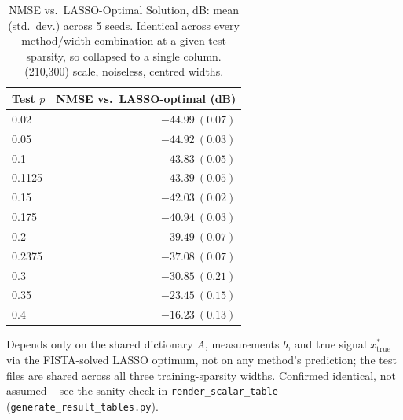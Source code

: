 \begin{table}[htbp]
\centering
\caption{NMSE vs.\ LASSO-Optimal Solution, dB: mean (std.\ dev.) across 5 seeds. Identical across every method/width combination at a given test sparsity, so collapsed to a single column. (210,300) scale, noiseless, centred widths.}
\label{tab:exp2try3-nmse-lassoopt}
\begin{tabular}{@{} l r @{}}
\toprule
Test $p$ & NMSE vs.\ LASSO-optimal (dB) \\
\midrule
0.02 & $-44.99\ (0.07)$ \\
0.05 & $-44.92\ (0.03)$ \\
0.1 & $-43.83\ (0.05)$ \\
0.1125 & $-43.39\ (0.05)$ \\
0.15 & $-42.03\ (0.02)$ \\
0.175 & $-40.94\ (0.03)$ \\
0.2 & $-39.49\ (0.07)$ \\
0.2375 & $-37.08\ (0.07)$ \\
0.3 & $-30.85\ (0.21)$ \\
0.35 & $-23.45\ (0.15)$ \\
0.4 & $-16.23\ (0.13)$ \\
\bottomrule
\end{tabular}
\vspace{2pt}
\begin{minipage}{\linewidth}\footnotesize
Depends only on the shared dictionary $A$, measurements $b$, and true signal $x^*_{\text{true}}$ via the FISTA-solved LASSO optimum, not on any method's prediction; the test files are shared across all three training-sparsity widths. Confirmed identical, not assumed -- see the sanity check in \texttt{render\_scalar\_table} (\texttt{generate\_result\_tables.py}).
\end{minipage}
\end{table}
